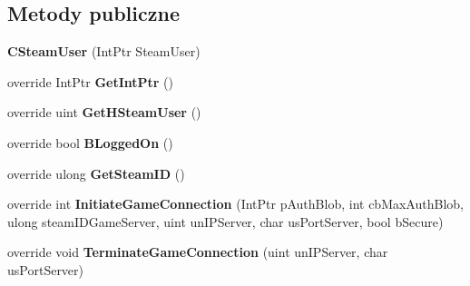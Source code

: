 \subsection*{Metody publiczne}
\begin{DoxyCompactItemize}
\item 
\mbox{\label{class_valve_1_1_steamworks_1_1_c_steam_user_ab0511020b27d41d255b3f561919e9c61}} 
{\bfseries C\+Steam\+User} (Int\+Ptr Steam\+User)
\item 
\mbox{\label{class_valve_1_1_steamworks_1_1_c_steam_user_a8ef616bb07361eadaace0f9f5dc712fb}} 
override Int\+Ptr {\bfseries Get\+Int\+Ptr} ()
\item 
\mbox{\label{class_valve_1_1_steamworks_1_1_c_steam_user_a5e058c6559ad19e1964b162066064094}} 
override uint {\bfseries Get\+H\+Steam\+User} ()
\item 
\mbox{\label{class_valve_1_1_steamworks_1_1_c_steam_user_a1c02870163bb4ac81ce464ac377decde}} 
override bool {\bfseries B\+Logged\+On} ()
\item 
\mbox{\label{class_valve_1_1_steamworks_1_1_c_steam_user_a6b173b42056b04d25f68c6f9f23958ae}} 
override ulong {\bfseries Get\+Steam\+ID} ()
\item 
\mbox{\label{class_valve_1_1_steamworks_1_1_c_steam_user_a0774feba5896b7407cc818b756f9694f}} 
override int {\bfseries Initiate\+Game\+Connection} (Int\+Ptr p\+Auth\+Blob, int cb\+Max\+Auth\+Blob, ulong steam\+I\+D\+Game\+Server, uint un\+I\+P\+Server, char us\+Port\+Server, bool b\+Secure)
\item 
\mbox{\label{class_valve_1_1_steamworks_1_1_c_steam_user_a1c041a5393b810a3e85000487fe70a39}} 
override void {\bfseries Terminate\+Game\+Connection} (uint un\+I\+P\+Server, char us\+Port\+Server)
\item 
\mbox{\label{class_valve_1_1_steamworks_1_1_c_steam_user_a2441ca19321274e6f4b2b08ca010687c}} 

\end{DoxyCompactItemize}
